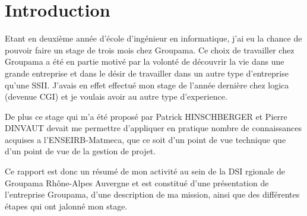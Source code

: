 \chapter*{Introduction}
\thispagestyle{fancy}

Etant en deuxième année d'école d'ingénieur en informatique, j'ai eu
la chance de pouvoir faire un stage de trois mois chez Groupama. Ce
choix de travailler chez Groupama a été en partie motivé par la
volonté de découvrir la vie dans une grande entreprise et dans le
désir de travailler dans un autre type d'entreprise qu'une
SSII. J'avais en effet effectué mon stage de l'année dernière chez
logica (devenue CGI) et je voulais avoir au autre type d'experience.

De plus ce stage qui m'a été proposé par Patrick HINSCHBERGER et
Pierre DINVAUT devait me permettre d'appliquer en pratique nombre de
connaissances acquises a l'ENSEIRB-Matmeca, que ce soit d'un point de
vue technique que d'un point de vue de la gestion de projet.

Ce rapport est donc un résumé de mon activité au sein de la DSI
rgionale de Groupama Rhône-Alpes Auvergne et est constitué d'une
présentation de l'entreprise Groupama, d'une description de ma
mission, ainsi que des différentes étapes qui ont jalonné mon stage.
 

